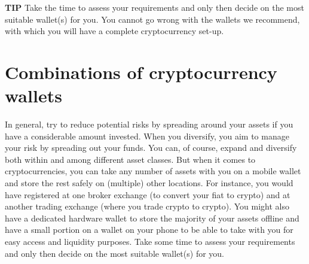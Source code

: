     \bigskip
    \begin{tipbox}{\textbf{TIP}}
    Take the time to assess your requirements and only then decide on the most suitable wallet(s) for you. You cannot go wrong with the wallets we recommend, with which you will have a complete cryptocurrency set-up. 
    \end{tipbox}

\section{Combinations of cryptocurrency wallets}
In general, try to reduce potential risks by spreading around your assets if you have a considerable amount invested. When you diversify, you aim to manage your risk by spreading out your funds. You can, of course, expand and diversify both within and among different asset classes. But when it comes to cryptocurrencies, you can take any number of assets with you on a mobile wallet and store the rest safely on (multiple) other locations. For instance, you would have registered at one broker exchange (to convert your fiat to crypto) and at another trading exchange (where you trade crypto to crypto). You might also have a dedicated hardware wallet to store the majority of your assets offline and have a small portion on a wallet on your phone to be able to take with you for easy access and liquidity purposes. Take some time to assess your requirements and only then decide on the most suitable wallet(s) for you. 


